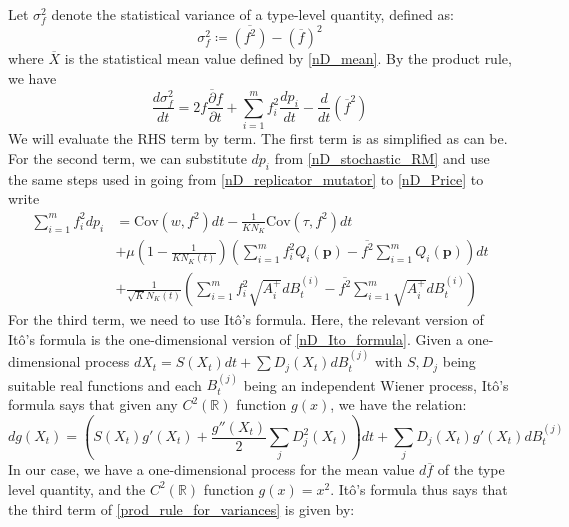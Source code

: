 Let $\sigma^2_{f}$ denote the statistical variance of a type-level quantity, defined as:
\begin{equation}
    \sigma^2_{f} \coloneqq \overline{(f^2)} - (\overline{f})^2
\end{equation}
where $\overline{X}$ is the statistical mean value defined by \eqref{nD_mean}. By the product rule, we have
\begin{equation}
\label{prod_rule_for_variances}
\frac{d\sigma^2_{f}}{dt} = 2\overline{f\frac{\partial f}{\partial t}} + \sum\limits_{i=1}^{m}f_i^2\frac{dp_i}{dt} - \frac{d}{dt}(\overline{f}^2)
\end{equation}
We will evaluate the RHS term by term. The first term is as simplified as can be. For the second term, we can substitute $dp_i$ from \eqref{nD_stochastic_RM} and use the same steps used in going from \eqref{nD_replicator_mutator} to \eqref{nD_Price} to write
\begin{equation}
\label{2nd_term_for_variances}
\begin{aligned}
\sum\limits_{i=1}^{m}f_i^2dp_i &= \textrm{Cov}(w,f^2)dt - \frac{1}{KN_K}\textrm{Cov}(\tau,f^2)dt\\
&+ \mu\left(1-\frac{1}{KN_K(t)}\right)\left(\sum\limits_{i=1}^{m}f^2_iQ_i(\mathbf{p}) - \overline{f^2}\sum\limits_{i=1}^{m}Q_i(\mathbf{p})\right)dt \\
&+\frac{1}{\sqrt{K}N_{K}(t)}\left(\sum\limits_{i=1}^{m}f^2_i\sqrt{A_i^+}dB_{t}^{(i)} - \overline{f^2}\sum\limits_{i=1}^{m}\sqrt{A_i^+}dB_{t}^{(i)}\right)
\end{aligned}
\end{equation}
For the third term, we need to use It\^{o}'s formula. Here, the relevant version of It\^{o}'s formula is the one-dimensional version of \eqref{nD_Ito_formula}. Given a one-dimensional process $dX_t = S(X_t)dt + \sum D_j(X_t)dB^{(j)}_t$ with $S, D_j$ being suitable real functions and each $B^{(j)}_t$ being an independent Wiener process, It\^{o}'s formula says that given any $C^2(\mathbb{R})$ function $g(x)$, we have the relation:
\begin{equation}
\label{1D_Ito_formula}
dg(X_t) = \left(S(X_t)g'(X_t) + \frac{g''(X_t)}{2}\sum\limits_{j}D_j^2(X_t)\right)dt + \sum\limits_{j}D_j(X_t)g'(X_t)dB^{(j)}_t 
\end{equation}
In our case, we have a one-dimensional process for the mean value $d\overline{f}$ of the type level quantity, and the $C^2(\mathbb{R})$ function $g(x) = x^2$. It\^{o}'s formula thus says that the third term of \eqref{prod_rule_for_variances} is given by:
